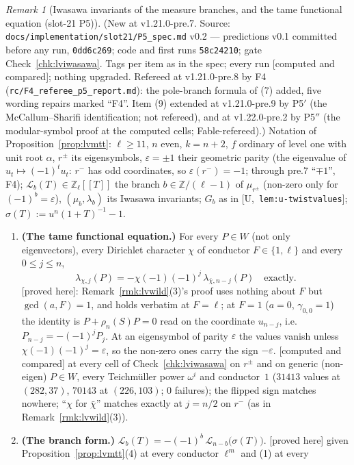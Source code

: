 \documentclass[11pt]{article}
\theoremstyle{remark}
\newtheorem{remark}[theorem]{Remark}
\newcommand{\Z}{\mathbb{Z}}
\newcommand{\PROVED}{\textsf{[proved here]}}
\newcommand{\CMPD}{\textsf{[computed and compared]}}   %
\newcommand{\Ucite}[1]{[U,~\texttt{#1}]}               %
\begin{document}
\begin{remark}[Iwasawa invariants of the measure branches, and the tame functional equation (slot-21 P5)]\label{rmk:lviwasawa}
(New at v1.21.0-pre.7. Source: \texttt{docs/implementation/slot21/P5\_spec.md} v0.2 --- predictions v0.1 committed before any run, \texttt{0dd6c269}; code and first runs \texttt{58c24210}; gate
Check~\ref{chk:lviwasawa}. Tags per item as in the spec; every run \CMPD; nothing upgraded. Refereed at v1.21.0-pre.8 by F4 (\texttt{rc/F4\_referee\_p5\_report.md}): the pole-branch formula of (7)
added, five wording repairs marked ``F4''. Item (9) extended at v1.21.0-pre.9 by P5$'$ (the McCallum--Sharifi identification; not refereed), and at v1.22.0-pre.2 by P5$''$ (the modular-symbol proof at the computed cells; Fable-refereed).) Notation of Proposition~\ref{prop:lvmtt}: $\ell\ge11$, $n$ even, $k=n+2$, $f$ ordinary of level one with unit
root $\alpha$, $r^{\pm}$ its eigensymbols, $\varepsilon=\pm1$ their geometric parity (the eigenvalue of $u_t\mapsto(-1)^{t}u_t$: $r^{-}$ has odd coordinates, so $\varepsilon(r^{-})=-1$; through pre.7 ``$\mp1$'', F4); $\mathcal L_b(T)\in\Z_\ell[\![T]\!]$ the branch $b\in\Z/(\ell-1)$ of $\mu_{r^{\pm}}$ (non-zero only for $(-1)^{b}=\varepsilon$), $(\mu_b,\lambda_b)$ its Iwasawa
invariants; $G_b$ as in \Ucite{lem:u-twistvalues}; $\sigma(T):=u^{n}(1+T)^{-1}-1$.
\begin{enumerate}
\item \textbf{(The tame functional equation.)} For every $P\in W$ (not only eigenvectors), every Dirichlet character $\chi$ of conductor $F\in\{1,\ell\}$ and every $0\le j\le n$,
  \[\lambda_{\chi,j}(P)=-\chi(-1)(-1)^{j}\,\lambda_{\bar\chi,n-j}(P)\quad\text{exactly}.\]
  \PROVED: Remark~\ref{rmk:lvwild}(3)'s proof uses nothing about $F$ but $\gcd(a,F)=1$, and holds verbatim at $F=\ell$; at $F=1$ ($a=0$, $\gamma_{0,0}=1$) the identity is $P+\rho_n(S)P=0$ read on the
  coordinate $u_{n-j}$, i.e.\ $P_{n-j}=-(-1)^{j}P_j$. At an eigensymbol of parity $\varepsilon$ the values vanish unless $\chi(-1)(-1)^{j}=\varepsilon$, so the non-zero ones carry the sign $-\varepsilon$.
  \CMPD{} at every cell of Check~\ref{chk:lviwasawa} on $r^{\pm}$ and on generic (non-eigen) $P\in W$, every Teichm\"uller power $\omega^{i}$ and conductor~$1$ ($31413$ values at $(282,37)$, $70143$ at
  $(226,103)$; $0$ failures); the flipped sign matches nowhere; ``$\chi$ for $\bar\chi$'' matches exactly at $j=n/2$ on $r^{-}$ (as in Remark~\ref{rmk:lvwild}(3)).
\item \textbf{(The branch form.)} $\mathcal L_b(T)=-(-1)^{b}\,\mathcal L_{n-b}\bigl(\sigma(T)\bigr)$. \PROVED{} given Proposition~\ref{prop:lvmtt}(4) at every conductor $\ell^{m}$ and (1) at every

\end{enumerate}
\end{remark}
\end{document}
